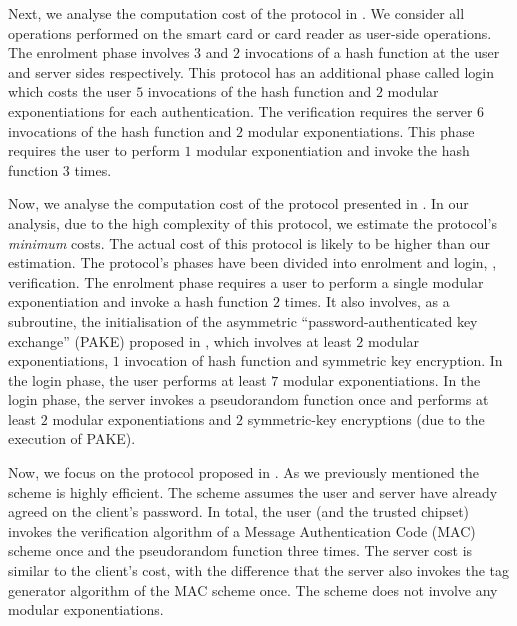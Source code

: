 Next, we analyse the computation cost of the protocol in \cite{WangW18}. We consider all operations performed on the smart card or card reader as user-side operations. The enrolment phase involves $3$ and $2$ invocations of a hash function at the user and server sides respectively. This protocol has an additional phase called login which costs the user  $5$ invocations of the hash function and $2$ modular exponentiations for each authentication.  The verification requires the server $6$ invocations of the hash function and $2$ modular exponentiations. This phase requires the user to perform $1$ modular exponentiation and invoke the hash function $3$ times. 


Now, we analyse the computation cost of the protocol presented in \cite{JareckiJKSS21}. In our analysis, due to the high complexity of this protocol, we estimate the protocol's \emph{minimum} costs. The actual cost of this protocol is likely to be higher than our estimation. The protocol's phases have been divided into enrolment and login, \ie, verification. The enrolment phase requires a user to perform a single modular exponentiation and invoke a hash function $2$ times. It also involves, as a subroutine, the initialisation of the asymmetric  ``password-authenticated key exchange'' (PAKE) proposed in \cite{GentryMR06}, which involves at least $2$ modular exponentiations, $1$ invocation of hash function and symmetric key encryption. In the login phase, the user performs at least $7$ modular exponentiations. In the login phase, the server invokes a pseudorandom function once and performs at least $2$ modular exponentiations and $2$ symmetric-key encryptions (due to the execution of PAKE). 

Now, we focus on the protocol proposed in \cite{MatsuoMY11}. As we previously mentioned the scheme is highly efficient. The scheme assumes the user and server have already agreed on the client's password. 
%
In total, the user (and the trusted chipset) invokes the verification algorithm of a Message Authentication Code (MAC) scheme once and the pseudorandom function three times. The server cost is similar to the client's cost, with the difference that the server also invokes the tag generator algorithm of the MAC scheme once. The scheme does not involve any modular exponentiations. 


